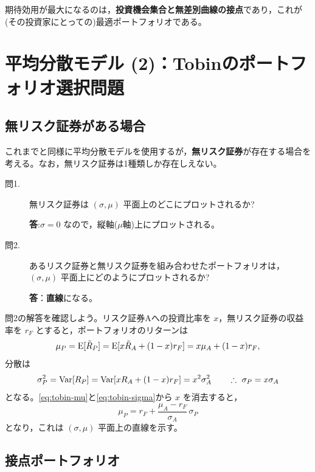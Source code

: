 期待効用が最大になるのは，\textbf{投資機会集合と無差別曲線の接点}であり，これが
(その投資家にとっての)最適ポートフォリオである。

\section{平均分散モデル (2)：Tobinのポートフォリオ選択問題}

\subsection{無リスク証券がある場合}

これまでと同様に平均分散モデルを使用するが，\textbf{無リスク証券}が存在する場合を
考える。なお，無リスク証券は1種類しか存在しえない。

\begin{description}
\item[問1.] 無リスク証券は $(\sigma,\mu)$ 平面上のどこにプロットされるか?

\textbf{答}:$\sigma = 0$ なので，縦軸($\mu$軸)上にプロットされる。
\item[問2.] あるリスク証券と無リスク証券を組み合わせたポートフォリオは，
$(\sigma,\mu)$ 平面上にどのようにプロットされるか?

\textbf{答}：\textbf{直線}になる。
\end{description}

問2の解答を確認しよう。リスク証券Aへの投資比率を $x$，無リスク証券の収益率を
$r_F$ とすると，ポートフォリオのリターンは
\begin{equation}
\mu_P = \mathrm{E}[\tilde R_P] = \mathrm{E}[x\tilde R_A + (1-x)r_F] = x\mu_A + (1-x)r_F,
\label{eq:tobin-mu}
\end{equation}
分散は
\begin{equation}
\sigma_P^2 = \mathrm{Var}[R_P] = \mathrm{Var}[xR_A + (1-x)r_F] = x^2\sigma_A^2
\qquad\therefore\ \sigma_P = x\sigma_A
\label{eq:tobin-sigma}
\end{equation}
となる。\eqref{eq:tobin-mu}と\eqref{eq:tobin-sigma}から $x$ を消去すると，
\begin{equation}
\mu_P = r_F + \frac{\mu_A - r_F}{\sigma_A}\,\sigma_P
\label{eq:tobin-line}
\end{equation}
となり，これは $(\sigma,\mu)$ 平面上の直線を示す。

\subsection{接点ポートフォリオ}

